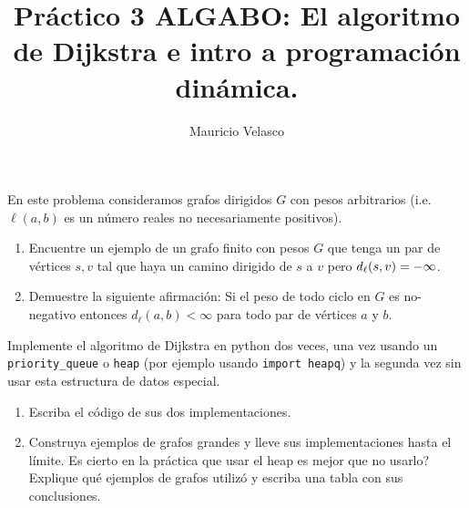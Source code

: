 \documentclass[12pt, a4paper]{article}
\date{}
\begin{document}
\title{Pr\'actico 3 ALGABO: El algoritmo de Dijkstra e intro a programaci\'on din\'amica.}
\author{Mauricio Velasco}
\maketitle{}

\item En este problema consideramos grafos dirigidos $G$ con pesos arbitrarios (i.e. $\ell(a,b)$ es un n\'umero reales no necesariamente positivos).
\begin{enumerate}
\item Encuentre un ejemplo de un grafo finito con pesos $G$ que tenga un par de v\'ertices $s,v$ tal que haya un camino dirigido de $s$ a $v$ pero $d_{\rm \ell}(s,v)=-\infty$.
\item Demuestre la siguiente afirmaci\'on: Si el peso de todo ciclo en $G$ es no-negativo entonces $d_{\ell}(a,b)<\infty$ para todo par de v\'ertices $a$ y $b$.
\end{enumerate}



\item Implemente el algoritmo de Dijkstra en python dos veces, una vez usando un \verb!priority_queue! o \verb!heap! (por ejemplo usando \verb!import heapq!) y la segunda vez sin usar esta estructura de datos especial.
\begin{enumerate}
\item Escriba el c\'odigo de sus dos implementaciones.
\item Construya ejemplos de grafos grandes y lleve sus implementaciones hasta el l\'imite. Es cierto en la pr\'actica que usar el heap es mejor que no usarlo? Explique qu\'e ejemplos de grafos utiliz\'o y escriba una tabla con sus conclusiones.
\end{enumerate}
\end{document}
